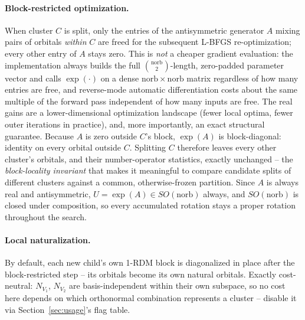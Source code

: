 \documentclass[10pt]{article}
\begin{document}
\paragraph{Block-restricted optimization.} When cluster $C$ is split, only the entries of the
antisymmetric generator $A$ mixing pairs of orbitals \emph{within} $C$ are freed for the
subsequent L-BFGS re-optimization; every other entry of $A$ stays zero. This is \emph{not} a
cheaper gradient evaluation: the implementation always builds the full
$\binom{\mathrm{norb}}{2}$-length, zero-padded parameter vector and calls $\exp(\cdot)$ on a
dense $\mathrm{norb}\times\mathrm{norb}$ matrix regardless of how many entries are free, and
reverse-mode automatic differentiation costs about the same multiple of the forward pass
independent of how many inputs are free. The real gains are a lower-dimensional optimization
landscape (fewer local optima, fewer outer iterations in practice), and, more importantly, an
exact structural guarantee. Because $A$ is zero outside $C$'s block, $\exp(A)$ is
block-diagonal: identity on every orbital outside $C$. Splitting $C$ therefore leaves every
other cluster's orbitals, and their number-operator statistics, exactly unchanged -- the
\emph{block-locality invariant} that makes it meaningful to compare candidate splits of
different clusters against a common, otherwise-frozen partition. Since $A$ is always real and
antisymmetric, $U=\exp(A)\in SO(\mathrm{norb})$ always, and $SO(\mathrm{norb})$ is closed under
composition, so every accumulated rotation stays a proper rotation throughout the search.

\paragraph{Local naturalization.} By default, each new child's own 1-RDM block is diagonalized in
place after the block-restricted step -- its orbitals become its own natural orbitals. Exactly
cost-neutral: $N_{V_1}$, $N_{V_2}$ are basis-independent within their own subspace, so no cost
here depends on which orthonormal combination represents a cluster -- disable it via
Section~\ref{sec:usage}'s flag table.
\end{document}
